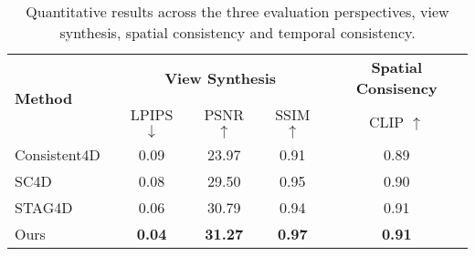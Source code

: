 \begin{table*}[t]
\caption{Quantitative results across the three evaluation perspectives, view synthesis, spatial consistency and temporal consistency.}
\setlength{\tabcolsep}{0.25em} %
\centering
\begin{tabular}{l|ccc|c}
\toprule
\multirow{2}{*}{\textbf{Method}} & \multicolumn{3}{c|}{\textbf{View Synthesis}} & \multicolumn{1}{c}{\textbf{Spatial Consisency}} \\
 & LPIPS $\downarrow$ & PSNR $\uparrow$ & SSIM $\uparrow$   & CLIP $\uparrow$  \\
\midrule
Consistent4D~\citep{jiang2023consistent4d} & 0.09 & 23.97 & 0.91 & 0.89  \\
SC4D~\citep{wu2024sc4d} & 0.08 & 29.50 & 0.95 & 0.90  \\
STAG4D~\citep{zeng2024stag4d}  & 0.06 & 30.79 & 0.94 & 0.91 \\
Ours & \textbf{0.04} & \textbf{31.27} & \textbf{0.97} & \textbf{0.91}  \\
\bottomrule
\end{tabular}%
\label{tab:quantity}
\end{table*}
